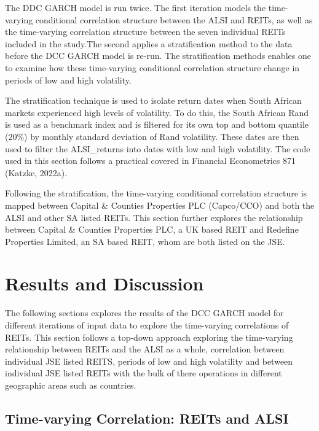 \documentclass[11pt,preprint, authoryear]{elsarticle}
\numberwithin{equation}{section}
\numberwithin{figure}{section}
\numberwithin{table}{section}
\begin{document}
The DDC GARCH model is run twice. The first iteration models the
time-varying conditional correlation structure between the ALSI and
REITs, as well as the time-varying correlation structure between the
seven individual REITs included in the study.The second applies a
stratification method to the data before the DCC GARCH model is re-run.
The stratification methods enables one to examine how these time-varying
conditional correlation structure change in periods of low and high
volatility.

The stratification technique is used to isolate return dates when South
African markets experienced high levels of volatility. To do this, the
South African Rand is used as a benchmark index and is filtered for its
own top and bottom quantile (20\%) by monthly standard deviation of Rand
volatility. These dates are then used to filter the ALSI\_returns into
dates with low and high volatility. The code used in this section
follows a practical covered in Financial Econometrics 871 (Katzke,
2022a).

Following the stratification, the time-varying conditional correlation
structure is mapped between Capital \& Counties Properties PLC
(Capco/CCO) and both the ALSI and other SA listed REITs. This section
further explores the relationship between Capital \& Counties Properties
PLC, a UK based REIT and Redefine Properties Limited, an SA based REIT,
whom are both listed on the JSE.

\hypertarget{results-and-discussion}{%
\section{\texorpdfstring{Results and Discussion
\label{Results}}{Results and Discussion }}\label{results-and-discussion}}

The following sections explores the results of the DCC GARCH model for
different iterations of input data to explore the time-varying
correlations of REITs. This section follows a top-down approach
exploring the time-varying relationship between REITs and the ALSI as a
whole, correlation between individual JSE listed REITS, periods of low
and high volatility and between individual JSE listed REITs with the
bulk of there operations in different geographic areas such as
countries.

\hypertarget{time-varying-correlation-reits-and-alsi}{%
\subsection{Time-varying Correlation: REITs and
ALSI}\label{time-varying-correlation-reits-and-alsi}}
\end{document}
